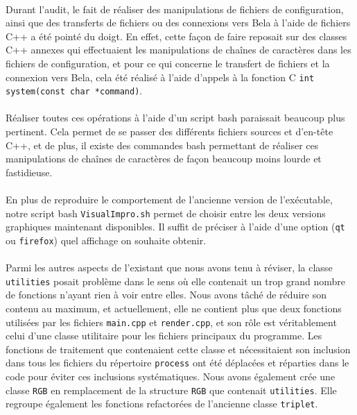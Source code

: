 \paragraph{}
Durant l'audit, le fait de réaliser des manipulations de fichiers de
configuration, ainsi que des transferts de fichiers ou des connexions
vers Bela à l'aide de fichiers C++ a été pointé du doigt. En effet,
cette façon de faire reposait sur des classes C++ annexes qui
effectuaient les manipulations de chaînes de caractères dans les
fichiers de configuration, et pour ce qui concerne le transfert de
fichiers et la connexion vers Bela, cela été réalisé à l'aide d'appels
à la fonction C \verb!int system(const char *command)!.
\paragraph{}
Réaliser toutes ces opérations à l'aide d'un script bash paraissait
beaucoup plus pertinent. Cela permet de se passer des différents
fichiers sources et d'en-tête C++, et de plus, il existe des commandes
bash permettant de réaliser ces manipulations de chaînes de caractères
de façon beaucoup moins lourde et fastidieuse.
\paragraph{}
En plus de reproduire le comportement de l'ancienne version de
l'exécutable, notre script bash \verb!VisualImpro.sh! permet de
choisir entre les deux versions graphiques maintenant disponibles. Il
suffit de préciser à l'aide d'une option (\verb!qt! ou \verb!firefox!)
quel affichage on souhaite obtenir.
\paragraph{}
Parmi les autres aspects de l'existant que nous avons tenu à réviser,
la classe \verb!utilities! posait problème dans le sens où elle
contenait un trop grand nombre de fonctions n'ayant rien à voir entre
elles. Nous avons tâché de réduire son contenu au maximum, et
actuellement, elle ne contient plus que deux fonctions utilisées par
les fichiers \verb!main.cpp! et \verb!render.cpp!, et son rôle est
véritablement celui d'une classe utilitaire pour les fichiers
principaux du programme. Les fonctions de traitement que contenaient
cette classe et nécessitaient son inclusion dans tous les fichiers du
répertoire \verb!process! ont été déplacées et réparties dans le code
pour éviter ces inclusions systématiques. Nous avons également crée
une classe \verb!RGB! en remplacement de la structure \verb!RGB! que
contenait \verb!utilities!. Elle regroupe également les fonctions
refactorées de l'ancienne classe \verb!triplet!.
